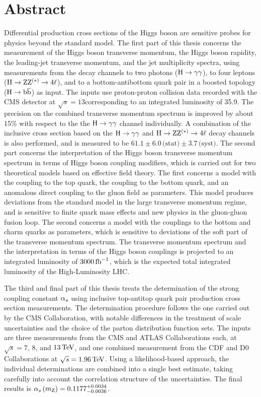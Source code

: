 \section*{Abstract}

Differential production cross sections of the Higgs boson are sensitive probes for physics beyond the standard model.
% 
The first part of this thesis concerns the measurement of the Higgs boson transverse momentum, the Higgs boson rapidity, the leading-jet transverse momentum, and the jet multiplicity spectra, using measurements from the decay channels to two photons ($\mathrm{H}\to\mathrm{\gamma}\mathrm{\gamma}$), to four leptons ($\mathrm{H}\to\mathrm{Z}\mathrm{Z}^{(\ast)}\to 4\ell$), and to a bottom-antibottom quark pair in a boosted topology ($\mathrm{H}\to\mathrm{b}\overline{\mathrm{b}}$) as input.
% 
The inputs use proton-proton collision data recorded with the CMS detector at $\sqrt{s}=13$\TeV corresponding to an integrated luminosity of 35.9\fbinv.
% 
The precision on the combined transverse momentum spectrum is improved by about 15\% with respect to the the $\mathrm{H}\to\mathrm{\gamma}\mathrm{\gamma}$ channel individually.
% 
A combination of the inclusive cross section based on the $\mathrm{H}\to\mathrm{\gamma}\mathrm{\gamma}$ and $\mathrm{H}\to\mathrm{Z}\mathrm{Z}^{(\ast)}\to 4\ell$ decay channels is also performed, and is measured to be $61.1   \pm 6.0 \,\text{(stat)} \pm 3.7 \,\text{(syst)}$\pb.
% 
The second part concerns the interpretation of the Higgs boson transverse momentum spectrum in terms of Higgs boson coupling modifiers, which is carried out for two theoretical models based on effective field theory.
% 
The first concerns a model with the coupling to the top quark, the coupling to the bottom quark, and an anomalous direct coupling to the gluon field as parameters.
% 
This model produces deviations from the standard model in the large transverse momentum regime, and is sensitive to finite quark mass effects and new physics in the gluon-gluon fusion loop.
% 
The second concerns a model with the couplings to the bottom and charm quarks as parameters, which is sensitive to deviations of the soft part of the transverse momentum spectrum.
% 
The transverse momentum spectrum and the interpretation in terms of the Higgs boson couplings is projected to an integrated luminosity of $3000\,\text{fb}^{-1}$, which is the expected total integrated luminosity of the High-Luminosity LHC.


The third and final part of this thesis treats the determination of the strong coupling constant $\alpha_s$ using inclusive top-antitop quark pair production cross section measurements.
% 
The determination procedure follows the one carried out by the CMS Collaboration, with notable differences in the treatment of scale uncertainties and the choice of the parton distribution function sets.
% 
The inputs are three measurements from the CMS and ATLAS Collaborations each, at $\sqrt{s}=7$, $8$, and $13\,\text{TeV}$, and one combined measurement from the CDF and D0 Collaborations at $\sqrt{s}=1.96\,\text{TeV}$.
% 
Using a likelihood-based approach, the individual determinations are combined into a single best estimate, taking carefully into account the correlation structure of the uncertainties.
% 
The final results is $\alpha_s \left( m_\mathrm{Z} \right)  = 0.1177^{+0.0034}_{-0.0036}$.



